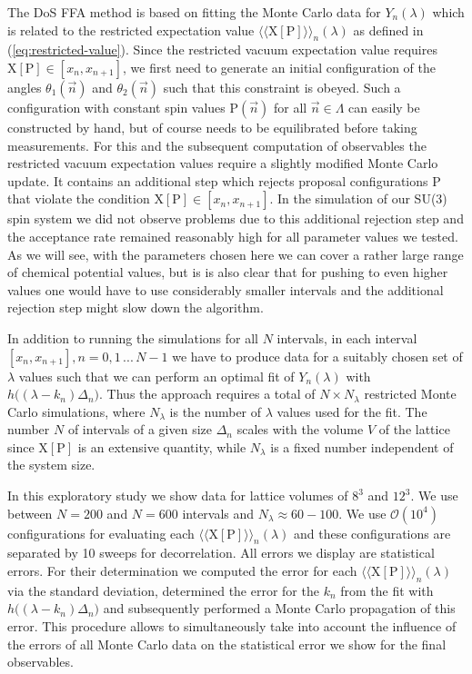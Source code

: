 \documentclass[a4paper,11pt]{article}
\begin{document}
The DoS FFA method is based on fitting the Monte Carlo data for $Y_n(\lambda)$ which is related to 
the restricted expectation value $\langle \langle \mathrm{X[P]} \rangle \rangle_{n}(\lambda)$ as defined in 
(\ref{eq:restricted-value}).  Since the restricted vacuum expectation value requires $\mathrm{X[P]} \in [x_n, x_{n+1}]$, 
we first need to generate an initial configuration of the angles $\theta_1(\vec{n})$ and $\theta_2(\vec{n})$
such that this constraint is obeyed. Such a configuration with constant spin values $\mathrm{P}(\vec{n})$ for all 
$\vec{n} \in \Lambda$ can easily be constructed by hand, but of course needs to be equilibrated before taking 
measurements. For this and the subsequent computation of observables the restricted vacuum expectation values 
require a slightly modified Monte Carlo update. It contains an additional step which rejects proposal 
configurations $\mathrm{P}$ that violate the condition $\mathrm{X[P]} \in [x_n, x_{n+1}]$. 
In the simulation of our SU(3) spin system we did not observe problems due to this additional rejection step 
and the acceptance rate remained reasonably high for all parameter values we tested. As we will see, with the 
parameters chosen here we can cover a rather large range of chemical potential values, but is is also clear that for 
pushing to even higher values one would have to use considerably smaller intervals and the additional rejection 
step might slow down the algorithm.  

In addition to running the simulations for all $N$ intervals, in each interval $[x_n, x_{n+1}], n = 0, 1 \, ... \, N-1$ 
we have to produce data for a suitably chosen set of $\lambda$ values such that we can perform 
an optimal fit of $Y_n(\lambda)$ with $h\Big(\!(\lambda-k_n)\Delta_n \!\Big)$. Thus the approach requires a total
of $N \times N_\lambda$ restricted Monte Carlo simulations, where $N_\lambda$ is the number of $\lambda$ values 
used for the fit. The number $N$ of intervals of a given size $\Delta_n$ 
scales with the volume $V$ of the lattice since $\mathrm{X[P]}$ is an 
extensive quantity, while $N_\lambda$ is a fixed number independent of the system size.

In this exploratory study we show data for lattice volumes of $8^3$ and $12^3$. We use between $N = 200$ and 
$N = 600$ intervals and $N_{\lambda}\approx60-100$. We use $\mathcal{O}(10^4)$ configurations for evaluating each 
$\langle \langle \mathrm{X[P]} \rangle \rangle_{n}(\lambda)$ and these configurations are separated by 
10 sweeps for decorrelation.  All errors we display are statistical errors. For their determination 
we computed the error for each $\langle \langle \mathrm{X[P]} \rangle \rangle_{n}(\lambda)$ via the standard deviation, 
determined the error for the $k_n$ from the fit with $h\Big(\!(\lambda-k_n)\Delta_n \!\Big)$ and subsequently 
performed a Monte Carlo propagation of this error. This procedure allows to simultaneously take into account the
influence of the errors of all Monte Carlo data on the statistical error we show for the final observables. 
\end{document}
